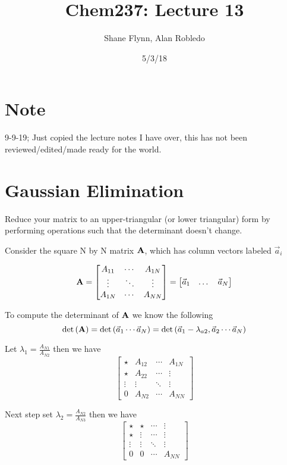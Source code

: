 \documentclass{article}
\title{Chem237: Lecture 13}
\date{5/3/18}
\author{Shane Flynn, Alan Robledo}
\newcommand{\be}{\begin{equation}}
\newcommand{\ee}{\end{equation}}
\newcommand{\bA}{\mbox{\bf A}}
\begin{document}
\maketitle

\section{Note}
9-9-19; Just copied the lecture notes I have over, this has not been reviewed/edited/made ready for the world.

\section*{Gaussian Elimination}
Reduce your matrix to an upper-triangular (or lower triangular) form by performing operations such that the determinant doesn't change.

Consider the square N by N matrix $\bA$, which has column vectors labeled $\vec{a}_i$

\be
\bA =
\begin{bmatrix}
    A_{11}  & \dotsb &  A_{1N} \\
    \vdots  & \ddots &  \vdots \\
    A_{1N}  & \dotsb &  A_{NN}
\end{bmatrix}
    =
\begin{bmatrix}
        \vec{a}_1 & \dots  & \vec{a}_N
\end{bmatrix}
\ee

To compute the determinant of $\bA$ we know the following
\be
\det\left(\bA\right) = \det\left(\vec{a}_1 \cdots  \vec{a}_N \right) = \det\left(\vec{a}_1- \lambda_{a2}, \vec{a}_2 \cdots \vec{a}_N \right)
\ee

Let $\lambda_1 = \frac{A_{N1}}{A_{N2}}$ then we have
\be
\begin{bmatrix}
    \star  & A_{12} & \dotsb &  A_{1N} \\
    \star & A_{22} &\dotsb &  \vdots \\
    \vdots & \vdots &  \ddots &  \vdots \\
    0  & A_{N2} & \dotsb &  A_{NN}
\end{bmatrix}
\ee

Next step set $\lambda_2 = \frac{A_{N2}}{A_{N3}}$ then we have
\be
\begin{bmatrix}
    \star  & \star & \dotsb & \vdots \\
    \star & \vdots &\dotsb &  \vdots \\
    \vdots & \vdots &  \ddots &  \vdots \\
    0  & 0 & \dotsb &  A_{NN}
\end{bmatrix}
\ee
\end{document}
